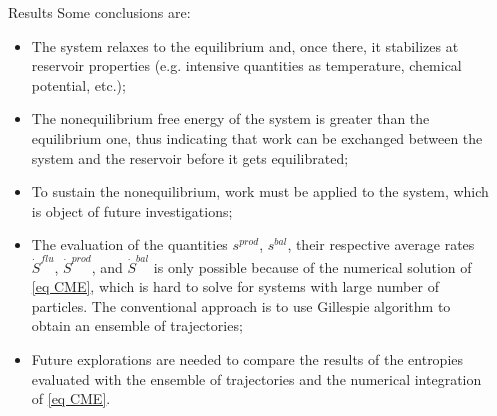\documentclass[final]{beamer}
\newlength{\sepwidth}
\newlength{\colwidth}
\newcommand{\separatorcolumn}{\begin{column}{\sepwidth}\end{column}}
\begin{document}
\begin{frame}[t]
\begin{columns}[t]
\begin{column}{\colwidth}
\begin{block}{Results}
Some conclusions are:
%
\begin{itemize}
\justifying
\item The system relaxes to the equilibrium and, once there, it stabilizes at reservoir properties (e.g. intensive quantities as temperature, chemical potential, etc.);
\item The nonequilibrium free energy of the system is greater than the equilibrium one, thus indicating that work can be exchanged between the system and the reservoir before it gets equilibrated;
\item To sustain the nonequilibrium, work must be applied to the system, which is object of future investigations;
\item The evaluation of the quantities $s^{prod}$, $s^{bal}$, their respective average rates $\dot{S}^{flu}$, $\dot{S}^{prod}$, and $\dot{S}^{bal}$ is only possible because of the numerical solution of \eqref{eq CME}, which is hard to solve for systems with large number of particles. The conventional approach is to use Gillespie algorithm to obtain an ensemble of trajectories;
\item Future explorations are needed to compare the results of the entropies evaluated with the ensemble of trajectories and the numerical integration of \eqref{eq CME}.
\end{itemize}


\end{block}
%


\end{column}

\separatorcolumn
\end{columns}
 \end{frame}
\end{document}
